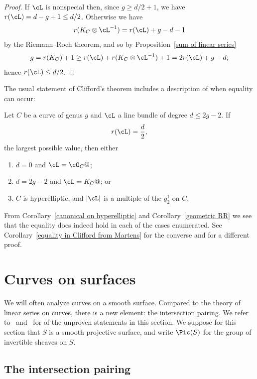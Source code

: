 \begin{proof}
If $\cL$ is nonspecial then, since $g\geq d/2 + 1$, we have $r(\cL) = d-g+1\leq d/2$.
Otherwise we have
$$
r(K_C\otimes \cL^{-1}) = r(\cL) +g - d - 1
$$
by the Riemann--Roch theorem,
and so by Proposition~\ref{sum of linear series}
$$
g = r(K_C)+1  \geq r(\cL) + r(K_C\otimes \cL^{-1}) +1  = 2r(\cL) +g - d;
$$
hence $r(\cL) \leq d/2$.
\end{proof}

The usual statement of Clifford's theorem includes a description of when equality can occur:

\begin{theorem}\label{Clifford}\label{Clifford equality}
Let $C$ be a curve of genus $g$ and $\cL$ a line bundle of degree $d \leq 2g-2$. If
$$
r(\cL) = \frac{d}{2},
$$
the largest possible value, then either
\begin{enumerate}
\item $d=0$ and $\cL = \cO_C@$;
\item $d = 2g-2$ and $\cL = K_C@$; or
\item $C$ is hyperelliptic, and $|\cL|$ is a multiple of the $g^1_2$ on $C$.
\end{enumerate}
\end{theorem}

From Corollary~\ref{canonical on hyperelliptic} and Corollary~\ref{geometric RR} we see that the equality does indeed hold
in each of the cases enumerated. See
Corollary~\ref{equality in Clifford from Martens} for the converse and \cite[IV.5.4]{Hartshorne1977}
for a different proof.

 \section{Curves on surfaces}\label{surface basics}
 
 We will often analyze curves  on a smooth surface. Compared to the theory of linear series on curves, there is a new element: the intersection pairing. We refer to~\cite[Chapter V]{Hartshorne1977}
%
 and~\cite[Chapter I]{Beauville} for 
of the unproven statements in this section.
 We suppose for this section that $S$ is a smooth projective surface,
 and write $\Pic(S)$ for the group of invertible sheaves on $S$.

\subsection*{The intersection pairing}

